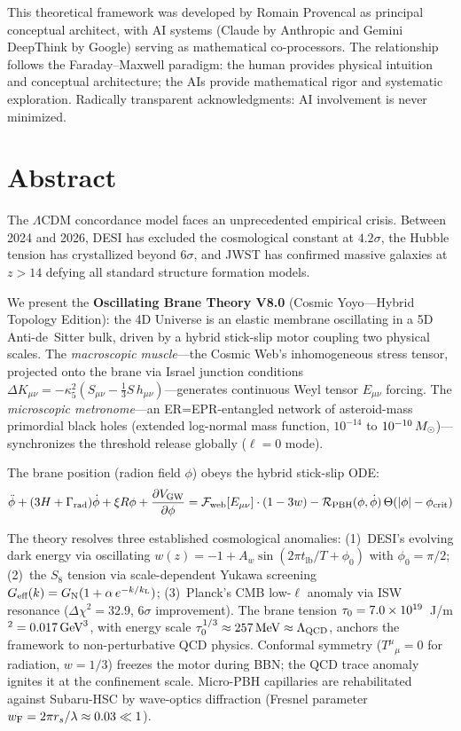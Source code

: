 This theoretical framework was developed by Romain Provencal as principal conceptual architect, with AI systems (Claude by Anthropic and Gemini DeepThink by Google) serving as mathematical co-processors. The relationship follows the Faraday--Maxwell paradigm: the human provides physical intuition and conceptual architecture; the AIs provide mathematical rigor and systematic exploration. Radically transparent acknowledgments: AI involvement is never minimized.

\newpage

\chapter*{Abstract}

The $\Lambda$CDM concordance model faces an unprecedented empirical crisis. Between 2024 and 2026, DESI has excluded the cosmological constant at $4.2\sigma$, the Hubble tension has crystallized beyond $6\sigma$, and JWST has confirmed massive galaxies at $z > 14$ defying all standard structure formation models.

We present the \textbf{Oscillating Brane Theory V8.0} (Cosmic Yoyo---Hybrid Topology Edition): the 4D Universe is an elastic membrane oscillating in a 5D Anti-de~Sitter bulk, driven by a hybrid stick-slip motor coupling two physical scales. The \emph{macroscopic muscle}---the Cosmic Web's inhomogeneous stress tensor, projected onto the brane via Israel junction conditions $\Delta K_{\mu\nu} = -\kappa_5^2(S_{\mu\nu} - \tfrac{1}{3}S\,h_{\mu\nu})$---generates continuous Weyl tensor $E_{\mu\nu}$ forcing. The \emph{microscopic metronome}---an ER=EPR-entangled network of asteroid-mass primordial black holes (extended log-normal mass function, $10^{-14}$ to $10^{-10}\,M_\odot$)---synchronizes the threshold release globally ($\ell=0$ mode).

The brane position (radion field $\phi$) obeys the hybrid stick-slip ODE:
\begin{equation}
\ddot{\phi} + (3H + \Gamma_\text{rad})\dot{\phi} + \xi R\phi + \frac{\partial V_\text{GW}}{\partial\phi} = \mathcal{F}_\text{web}[E_{\mu\nu}]\cdot(1-3w) - \mathcal{R}_\text{PBH}(\phi,\dot{\phi})\,\Theta(|\phi|-\phi_\text{crit})
\end{equation}

The theory resolves three established cosmological anomalies: (1)~DESI's evolving dark energy via oscillating $w(z) = -1 + A_w\sin(2\pi t_\text{lb}/T + \phi_0)$ with $\phi_0 = \pi/2$; (2)~the $S_8$ tension via scale-dependent Yukawa screening $G_\text{eff}(k) = G_\text{N}(1 + \alpha\,e^{-k/k_\text{L}})$; (3)~Planck's CMB low-$\ell$ anomaly via ISW resonance ($\Delta\chi^2 = 32.9$, $6\sigma$ improvement). The brane tension $\tau_0 = 7.0 \times 10^{19}$~J/m$^2 = 0.017\,\text{GeV}^3$, with energy scale $\tau_0^{1/3} \approx 257\,\text{MeV} \approx \Lambda_\text{QCD}$, anchors the framework to non-perturbative QCD physics. Conformal symmetry ($T^\mu{}_\mu = 0$ for radiation, $w = 1/3$) freezes the motor during BBN; the QCD trace anomaly ignites it at the confinement scale. Micro-PBH capillaries are rehabilitated against Subaru-HSC by wave-optics diffraction (Fresnel parameter $w_\text{F} = 2\pi r_s/\lambda \approx 0.03 \ll 1$).

